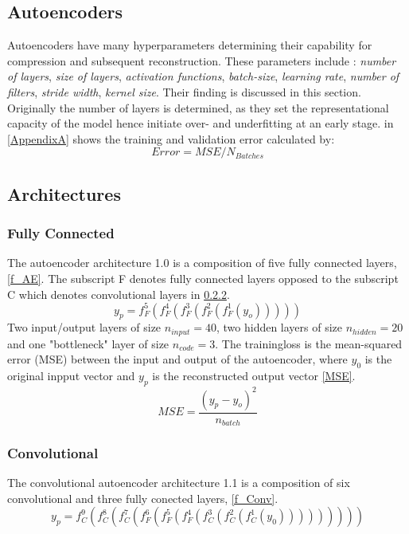 \documentclass[12pt, a4paper]{article}
\begin{document}
\subsection{Autoencoders}
Autoencoders have many hyperparameters determining their capability for compression and subsequent reconstruction. These parameters include : \textit{number of layers}, \textit{size of layers}, \textit{activation functions}, \textit{batch-size}, \textit{learning rate}, \textit{number of filters}, \textit{stride width}, \textit{kernel size}. Their finding is discussed in this section.\\
Originally the number of layers is determined, as they set the representational capacity of the model hence initiate over- and underfitting at an early stage.  in \cref{AppendixA} shows the training and validation error calculated by:
\begin{equation}
	Error = MSE / N_{Batches}
\end{equation}

\subsection{Architectures}
\subsubsection{Fully Connected}\label{Fully Connected}
The autoencoder architecture 1.0 is a composition of five fully connected layers, \cref{f_AE}. The subscript F denotes fully connected layers opposed to the subscript C which denotes convolutional layers in \cref{Convolutional}.
\begin{equation}
	y_p = f_{F}^5(f_{F}^4(f_{F}^3(f_{F}^2(f_{F}^1(y_o)))))
	\label{f_AE}
\end{equation}
Two input/output layers of size $n_{input}=40$, two hidden layers of size $n_{hidden} = 20$ and one "bottleneck" layer of size $n_{code} = 3$. The trainingloss is the mean-squared error (MSE) between the input and output of the autoencoder, where $y_0$ is the original inpput vector and $y_p$ is the reconstructed output vector \cref{MSE}.
\begin{equation}
	MSE = \frac{(y_p - y_o)^2}{n_{batch}}
	\label{MSE}
\end{equation}
\subsubsection{Convolutional}\label{Convolutional}
The convolutional autoencoder architecture 1.1 is a composition of six convolutional and three fully conected layers, \cref{f_Conv}.
\begin{equation}
y_p = f_{C}^9(f_{C}^8(f_{C}^7(f_{F}^6(f_{F}^5(f_{F}^4(f_{C}^3(f_{C}^2(f_{C}^1(y_0)))))))))
\label{f_Conv}
\end{equation}
\end{document}

